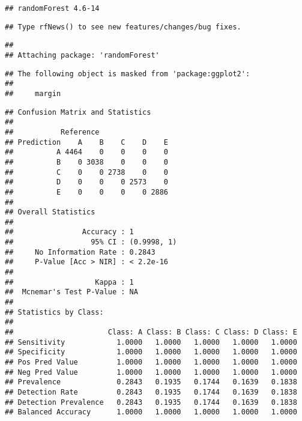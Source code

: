\documentclass[]{article}
\newenvironment{Shaded}{\begin{snugshade}}{\end{snugshade}}
\newcommand{\KeywordTok}[1]{\textcolor[rgb]{0.13,0.29,0.53}{\textbf{#1}}}
\newcommand{\DataTypeTok}[1]{\textcolor[rgb]{0.13,0.29,0.53}{#1}}
\newcommand{\StringTok}[1]{\textcolor[rgb]{0.31,0.60,0.02}{#1}}
\newcommand{\OperatorTok}[1]{\textcolor[rgb]{0.81,0.36,0.00}{\textbf{#1}}}
\newcommand{\NormalTok}[1]{#1}
\begin{document}
\begin{verbatim}
## randomForest 4.6-14
\end{verbatim}

\begin{verbatim}
## Type rfNews() to see new features/changes/bug fixes.
\end{verbatim}

\begin{verbatim}
## 
## Attaching package: 'randomForest'
\end{verbatim}

\begin{verbatim}
## The following object is masked from 'package:ggplot2':
## 
##     margin
\end{verbatim}

\begin{Shaded}
\end{Shaded}

\begin{verbatim}
## Confusion Matrix and Statistics
## 
##           Reference
## Prediction    A    B    C    D    E
##          A 4464    0    0    0    0
##          B    0 3038    0    0    0
##          C    0    0 2738    0    0
##          D    0    0    0 2573    0
##          E    0    0    0    0 2886
## 
## Overall Statistics
##                                      
##                Accuracy : 1          
##                  95% CI : (0.9998, 1)
##     No Information Rate : 0.2843     
##     P-Value [Acc > NIR] : < 2.2e-16  
##                                      
##                   Kappa : 1          
##  Mcnemar's Test P-Value : NA         
## 
## Statistics by Class:
## 
##                      Class: A Class: B Class: C Class: D Class: E
## Sensitivity            1.0000   1.0000   1.0000   1.0000   1.0000
## Specificity            1.0000   1.0000   1.0000   1.0000   1.0000
## Pos Pred Value         1.0000   1.0000   1.0000   1.0000   1.0000
## Neg Pred Value         1.0000   1.0000   1.0000   1.0000   1.0000
## Prevalence             0.2843   0.1935   0.1744   0.1639   0.1838
## Detection Rate         0.2843   0.1935   0.1744   0.1639   0.1838
## Detection Prevalence   0.2843   0.1935   0.1744   0.1639   0.1838
## Balanced Accuracy      1.0000   1.0000   1.0000   1.0000   1.0000
\end{verbatim}
\end{document}
